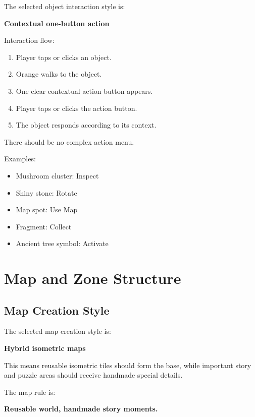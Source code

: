 \documentclass[12pt]{article}
\begin{document}
The selected object interaction style is:

\begin{center}
\textbf{Contextual one-button action}
\end{center}

Interaction flow:

\begin{enumerate}[leftmargin=*]
    \item Player taps or clicks an object.
    \item Orange walks to the object.
    \item One clear contextual action button appears.
    \item Player taps or clicks the action button.
    \item The object responds according to its context.
\end{enumerate}

There should be no complex action menu.

Examples:

\begin{itemize}[leftmargin=*]
    \item Mushroom cluster: Inspect
    \item Shiny stone: Rotate
    \item Map spot: Use Map
    \item Fragment: Collect
    \item Ancient tree symbol: Activate
\end{itemize}

\section{Map and Zone Structure}

\subsection{Map Creation Style}

The selected map creation style is:

\begin{center}
\textbf{Hybrid isometric maps}
\end{center}

This means reusable isometric tiles should form the base, while important story and puzzle areas should receive handmade special details.

The map rule is:

\begin{center}
\textbf{Reusable world, handmade story moments.}
\end{center}
\end{document}
